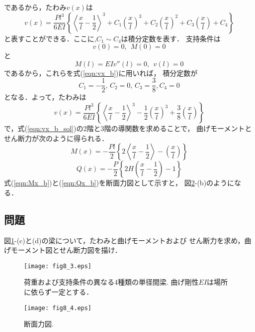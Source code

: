 \documentclass[10pt,a4j]{jarticle}
\begin{document}
\begin{enumerate}
であるから，たわみ$v(x)$は
\begin{equation}
	v(x)= \frac{Pl^3}{6EI}\left\{
		\left<\frac{x}{l}-\frac{1}{2}\right>^3
		+
		C_1
		\left(\frac{x}{l}\right)^3
		+
		C_2
		\left(\frac{x}{l}\right)^2
		+
		C_3
		\left(\frac{x}{l}\right)
		+
		C_4
	\right\}
	\label{eqn:vx_b}
\end{equation}
と表すことができる．ここに,$C_1\sim C_4$は積分定数を表す．
支持条件は
\begin{equation}
	v(0)=0, \ \ M(0)=0
	\label{eqn:bcon_bl}
\end{equation}
と
\begin{equation}
	M(l)=EIv''(l)=0, \ \ v(l)=0
	\label{eqn:bcon_bl}
\end{equation}
であるから，これらを式(\ref{eqn:vx_b})に用いれば，
積分定数が
\begin{equation}
	C_1=-\frac{1}{2}, \, 
	C_2=0, \,
	C_3=\frac{3}{8}, C_4=0
\end{equation}
となる．よって，たわみは
\begin{equation}
	v(x)= \frac{Pl^3}{6EI}\left\{
		\left<\frac{x}{l}-\frac{1}{2}\right>^3
		-
		\frac{1}{2}
		\left(\frac{x}{l}\right)^3
		+
		\frac{3}{8}
		\left(\frac{x}{l}\right)
	\right\}
	\label{eqn:vx_b_sol}
\end{equation}
で，式(\ref{eqn:vx_b_sol})の2階と3階の導関数を求めることで，
曲げモーメントとせん断力が次のように得られる．
\begin{equation}
	M(x)= 
	-\frac{Pl}{2}\left\{
		2
		\left<\frac{x}{l}-\frac{1}{2}\right>
		-
		\left(\frac{x}{l}\right)
	\right\}
	\label{eqn:Mx_b}
\end{equation}
\begin{equation}
	Q(x)= 
	-\frac{P}{2}\left\{
		2H\left(\frac{x}{l}-\frac{1}{2}\right)
		-
		1
	\right\}
	\label{eqn:Qx_b}
\end{equation}
式(\ref{eqn:Mx_b})と(\ref{eqn:Qx_b})を断面力図として示すと，
図\ref{fig:fig8_4}-(b)のようになる．
\end{enumerate}
\subsection{問題}
図\ref{fig:fig8_3}-(c)と(d)の梁について，たわみと曲げモーメントおよび
せん断力を求め，曲げモーメント図とせん断力図を描け．
\begin{figure}
	\begin{center}
	\texttt{[image: fig8\_3.eps]} 
	\end{center}
	\caption{
		荷重および支持条件の異なる4種類の単径間梁.
		曲げ剛性$EI$は場所に依らず一定とする．
	 } 
	\label{fig:fig8_3}
\end{figure}
\begin{figure}
	\begin{center}
	\texttt{[image: fig8\_4.eps]} 
	\end{center}
	\caption{
		断面力図.
	 } 
	\label{fig:fig8_4}
\end{figure}
\end{document}
